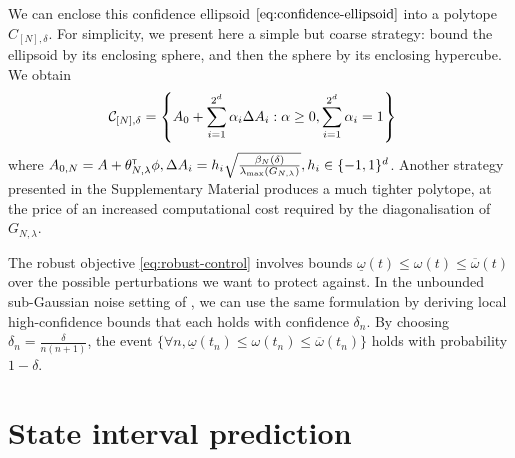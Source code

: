 We can enclose this confidence ellipsoid $\eqref{eq:confidence-ellipsoid}$ into a polytope $C_{[N],\delta}$. For simplicity, we present here a simple but coarse strategy: bound the ellipsoid by its enclosing sphere, and then the sphere by its enclosing hypercube. We obtain
\begin{align}
\label{eq:polytope}
&\mathcal{C}_{[N],\delta} = \left\{ A_{0}+\sum_{i=1}^{2^d}\alpha_{i}\Delta A_{i}: \alpha\geq 0,  \sum_{i=1}^{2^d}\alpha_{i}=1\right\}
\end{align}
where $A_{0,N} = A + \theta_{N,\lambda}^{\mathsf{\scriptscriptstyle T}}\phi, \Delta A_{i} = {h_i} \sqrt{\frac{\beta_N(\delta)}{\lambda_{\max}(G_{N,\lambda})}}, h_i\in\{-1,1\}^d$. Another strategy presented in the Supplementary Material produces a much tighter polytope, at the price of an increased computational cost required by the diagonalisation of $G_{N,\lambda}$.

\begin{remark}
	\begin{leftbar}[remarkbar]
	The robust objective \eqref{eq:robust-control} involves bounds $\underline{\omega}(t)\leq \omega(t) \leq \overline{\omega}(t)$ over the possible perturbations we want to protect against. In the unbounded sub-Gaussian noise setting of , we can use the same formulation by deriving local high-confidence bounds that each holds with confidence $\delta_n$. By choosing $\delta_n = \frac{\delta}{n(n+1)}$, the event $\{\forall n, \underline{\omega}(t_n) \leq \omega(t_n) \leq \overline{\omega}(t_n)\}$ holds with probability $1-\delta$.
	\end{leftbar}
\end{remark}

\section{State interval prediction}

\label{sec:prediction}

